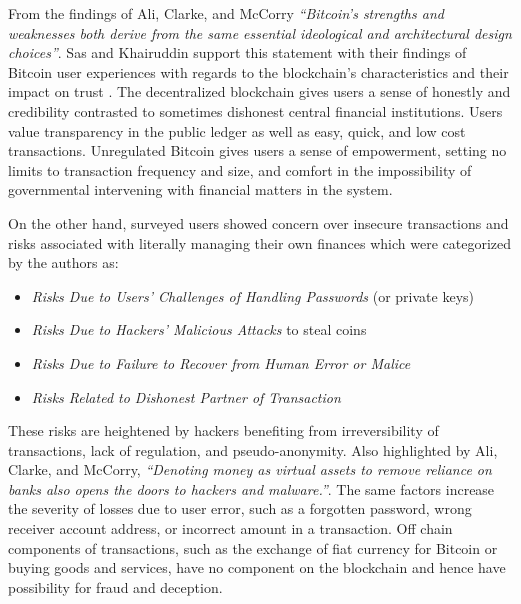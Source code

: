 \documentclass[a4paper,12pt]{article} %
\begin{document}
From the findings of Ali, Clarke, and McCorry \textit{``Bitcoin’s strengths and weaknesses both derive from the same essential ideological and architectural design choices''}\cite{Ali:2015:BPU:2990603.2990632}. Sas and Khairuddin support this statement with their findings of Bitcoin user experiences with regards to the blockchain's characteristics and their impact on trust \cite{sas2016design}. The decentralized blockchain gives users a sense of honestly and credibility contrasted to sometimes dishonest central financial institutions. Users value transparency in the public ledger as well as easy, quick, and low cost transactions. Unregulated Bitcoin gives users a sense of empowerment, setting no limits to transaction frequency and size, and comfort in the impossibility of governmental intervening with financial matters in the system.

On the other hand, surveyed users showed concern over insecure transactions and risks associated with literally managing their own finances which were categorized by the authors as:
\begin{itemize}
	\item \textit{Risks Due to Users' Challenges of Handling Passwords} (or private keys)
	\item \textit{Risks Due to Hackers' Malicious Attacks} to steal coins
	\item \textit{Risks Due to Failure to Recover from Human Error or Malice}
	\item \textit{Risks Related to Dishonest Partner of Transaction}
\end{itemize}
These risks are heightened by hackers benefiting from irreversibility of transactions, lack of regulation, and pseudo-anonymity. Also highlighted by Ali, Clarke, and McCorry, \textit{``Denoting money as virtual assets to remove reliance on banks also opens the doors to hackers and malware.''}\cite{Ali:2015:BPU:2990603.2990632}. The same factors increase the severity of losses due to user error, such as a forgotten password, wrong receiver account address, or incorrect amount in a transaction. Off chain components of transactions, such as the exchange of fiat currency for Bitcoin or buying goods and services, have no component on the blockchain and hence have possibility for fraud and deception.
\end{document}

